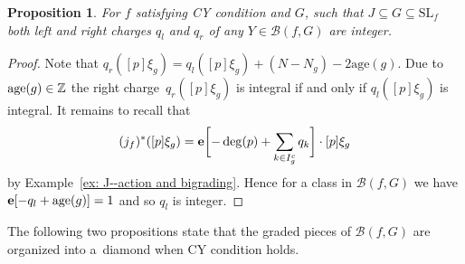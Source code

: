 \documentclass[10pt,a4paper]{amsart}
\numberwithin{equation}{section}
\newtheorem{Proposition}[Theorem]{Proposition}
 { \theoremstyle{definition}
\newtheorem{Definition}[Theorem]{Definition}
\newtheorem{Note}[Theorem]{Note}
\newtheorem{Example}[Theorem]{Example}
\newtheorem{Remark}[Theorem]{Remark} }
\newcommand{\ZZ}{{\mathbb{Z}}}
\newcommand{\SL}{{\mathrm{SL}}}
\newcommand{\epi}{{\bf e}}
\newcommand{\age}{\mathrm{age}}
\def\B{{\mathcal B}}
\begin{document}
\begin{Proposition}
	For $f$ satisfying CY condition and $G$, such that $J \subseteq G \subseteq \SL_f$ both left and right charges $q_l$ and $q_r$ of any $Y \in \B(f,G)$ are integer.
\end{Proposition}
\begin{proof}
	Note that $q_r([p]\xi_g) = q_l([p]\xi_g) + (N-N_g) - 2 \age(g)$. Due to ${\rm age}(g)\in\ZZ$ the right charge~$q_r([p]\xi_g)$ is integral if and only if $q_l([p]\xi_g)$ is integral.
 It remains to recall that
 \[
 (j_f)^*([p]\xi_g)=\epi\biggl[-\deg(p) + \sum_{k \in I_g^c} q_k\biggr]\cdot [p]\xi_g
 \]
 by Example~\ref{ex: J--action and bigrading}. Hence for a class in $\B(f,G)$ we have $\epi[-q_l+\age(g)]=1$ and so $q_l$ is integer.
\end{proof}

The following two propositions state that the graded pieces of $\B(f,G)$ are organized into a~diamond when CY condition holds.
\end{document}
